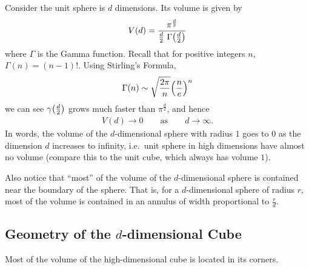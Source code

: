 \documentclass[12pt]{article}
\begin{document}
Consider the unit sphere is $d$ dimensions.  Its volume is given by
\begin{align*}
  V(d) = \frac{\pi^{\frac{d}{2}}}{\frac{d}{2}\ \Gamma\qty(\frac{d}{2})}
\end{align*}
where $\Gamma$ is the Gamma function.  Recall that for positive integers $n$, $\Gamma(n) = (n - 1)!$.  Using Stirling's Formula,
\begin{align*}
  \Gamma(n) \sim \sqrt{\frac{2\pi}{n}}\qty(\frac{n}{e})^n
\end{align*}
we can see $\gamma\qty(\frac{d}{2})$ grows much faster than $\pi^{\frac{d}{2}}$, and hence
\begin{align*}
  V(d) \rightarrow 0 \qquad \text{as} \qquad d \rightarrow \infty.
\end{align*}
In words, the volume of the $d$-dimensional sphere with radius $1$ goes to $0$ as the dimension $d$ increases to infinity, i.e.~unit sphere in high dimensions have almost no volume (compare this to the unit cube, which always has volume $1$).

Also notice that ``most'' of the volume of the $d$-dimensional sphere is contained near the boundary of the sphere.  That is, for a $d$-dimensional sphere of radius $r$, most of the volume is contained in an annulus of width proportional to $\frac{r}{d}$.

\subsection{Geometry of the $d$-dimensional Cube}

Most of the volume of the high-dimensional cube is located in its corners.
\end{document}
